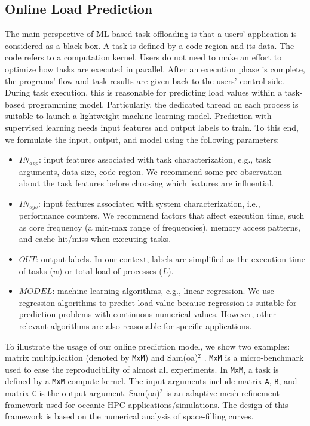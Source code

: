\subsection{Online Load Prediction} \label{subsec:online-load-prediction}

The main perspective of ML-based task offloading is that a users' application is considered as a black box. A task is defined by a code region and its data. The code refers to a computation kernel. Users do not need to make an effort to optimize how tasks are executed in parallel. After an execution phase is complete, the programs' flow and task results are given back to the users' control side.\\

During task execution, this is reasonable for predicting load values within a task-based programming model. Particularly, the dedicated thread on each process is suitable to launch a lightweight machine-learning model. Prediction with supervised learning needs input features and output labels to train. To this end, we formulate the input, output, and model using the following parameters:

\begin{itemize}
	\item $IN_{app}$: input features associated with task characterization, e.g., task arguments, data size, code region. We recommend some pre-observation about the task features before choosing which features are influential.
	\item $IN_{sys}$: input features associated with system characterization, i.e., performance counters. We recommend factors that affect execution time, such as core frequency (a min-max range of frequencies), memory access patterns, and cache hit/miss when executing tasks.
	\item $OUT$: output labels. In our context, labels are simplified as the execution time of tasks ($w$) or total load of processes ($L$).
	\item $MODEL$: machine learning algorithms, e.g., linear regression. We use regression algorithms to predict load value because regression is suitable for prediction problems with continuous numerical values. However, other relevant algorithms are also reasonable for specific applications.
\end{itemize}

To illustrate the usage of our online prediction model, we show two examples: matrix multiplication (denoted by \texttt{MxM}) and Sam(oa)$^2$ \cite{Meister2016AMRSamoa}. \texttt{MxM} is a micro-benchmark used to ease the reproducibility of almost all experiments. In \texttt{MxM}, a task is defined by a \texttt{MxM} compute kernel. The input arguments include matrix \texttt{A}, \texttt{B}, and matrix \texttt{C} is the output argument. Sam(oa)$^2$ is an adaptive mesh refinement framework used for oceanic HPC applications/simulations. The design of this framework is based on the numerical analysis of space-filling curves.\\

